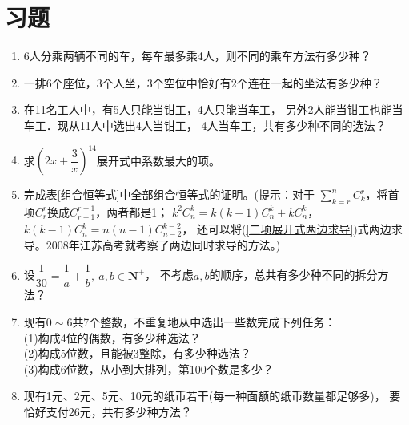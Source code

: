 \section{习题}
\begin{enumerate}[label={\textbf{\arabic*.}},leftmargin=
    \inteval{\myenumleftmargin}pt]
\item 6人分乘两辆不同的车，每车最多乘4人，则不同的乘车方法有多少种？

\item 一排6个座位，3个人坐，3个空位中恰好有2个连在一起的坐法有多少种？

\item 在11名工人中，有5人只能当钳工，4人只能当车工，
另外2人能当钳工也能当车工．现从11人中选出4人当钳工，
4人当车工，共有多少种不同的选法？

\item 求$ \left(2x+\dfrac{3}{x}\right)^{14} $展开式中系数最大的项。

\item 完成表\ref{组合恒等式}中全部组合恒等式的证明。(提示：对于
$ \sum\limits_{k=r}^{n} C_k^r $，将首项$ C_r^r $换成$ C_{r+1}^{r+1} $，两者都是1；
$ k^2C_n^k=k(k-1)C_n^k+kC_n^k $，$ k(k-1)C_n^k=n(n-1)C_{n-2}^{k-2} $，
还可以将(\ref{二项展开式两边求导})式两边求导。2008年江苏高考就考察了两边同时求导的方法。)

\item 设$ \dfrac{1}{30}=\dfrac{1}{a}+\dfrac{1}{b},\ a,b\in\textbf{N}^+ $，
不考虑$ a,b $的顺序，总共有多少种不同的拆分方法？

\item 现有$ 0\sim 6 $共7个整数，不重复地从中选出一些数完成下列任务：\\
(1)构成4位的偶数，有多少种选法？\\
(2)构成5位数，且能被3整除，有多少种选法？\\
(3)构成6位数，从小到大排列，第100个数是多少？

\item 现有1元、2元、5元、10元的纸币若干(每一种面额的纸币数量都足够多)，
要恰好支付26元，共有多少种方法？ 

\end{enumerate}



